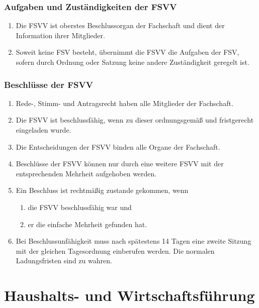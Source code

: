 \documentclass{article}
\begin{document}
\section{Aufgaben und Zuständigkeiten der FSVV}
\begin{enumerate}[(1)]
    \item Die FSVV ist oberstes Beschlussorgan der Fachschaft und dient der Information ihrer Mitglieder.
	\item Soweit keine FSV besteht, übernimmt die FSVV die Aufgaben der FSV, sofern durch Ordnung oder Satzung keine andere Zuständigkeit geregelt ist.
\end{enumerate}

\section{Beschlüsse der FSVV}

\begin{enumerate}[(1)]
	\item Rede-, Stimm- und Antragsrecht haben alle Mitglieder der Fachschaft.
	\item Die FSVV ist beschlussfähig, wenn zu dieser ordnungsgemäß und fristgerecht eingeladen wurde.
	\item Die Entscheidungen der FSVV binden alle Organe der Fachschaft. 
	\item Beschlüsse der FSVV können nur durch eine weitere FSVV mit der entsprechenden Mehrheit aufgehoben werden.
	\item Ein Beschluss ist rechtmäßig zustande gekommen, wenn
	\begin{enumerate}[1.]
		\item die FSVV beschlussfähig war und
		\item er die einfache Mehrheit gefunden hat.
	\end{enumerate}
	\item Bei Beschlussunfähigkeit muss nach spätestens 14 Tagen eine zweite Sitzung mit der gleichen Tagesordnung einberufen werden. Die normalen Ladungsfristen sind zu wahren.
\end{enumerate}

\part{Haushalts- und Wirtschaftsführung}
\end{document}
